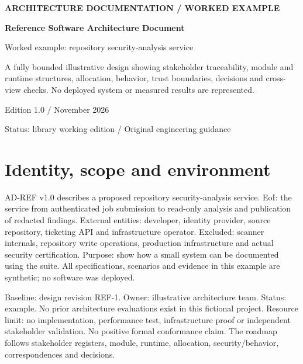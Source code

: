 \documentclass[11pt,letterpaper]{article}
\newcommand{\docsection}[1]{\Needspace{5\baselineskip}\section{#1}}
\begin{document}
\begin{titlepage}\thispagestyle{empty}\raggedright
\vspace*{0.65in}
{\sffamily\bfseries\color{teal} ARCHITECTURE DOCUMENTATION / WORKED EXAMPLE\par}
\vspace{0.35in}
{\sffamily\bfseries\color{navy}\Huge Reference Software Architecture Document\par}
\vspace{0.2in}
{\sffamily\Large\color{muted} Worked example: repository security-analysis service\par}
\vspace{0.35in}\noindent{\color{teal}\rule{\linewidth}{1.5pt}}\par
\vspace{0.3in}
A fully bounded illustrative design showing stakeholder traceability, module and runtime structures, allocation, behavior, trust boundaries, decisions and cross-view checks. No deployed system or measured results are represented.

\vfill
{\sffamily\small Edition 1.0 \quad /  November 2026\par
Status: library working edition \quad / \quad Original engineering guidance\par}
\end{titlepage}
\tableofcontents\clearpage
\docsection{Identity, scope and environment}
AD-REF v1.0 describes a proposed repository security-analysis service. EoI: the service from authenticated job submission to read-only analysis and publication of redacted findings. External entities: developer, identity provider, source repository, ticketing API and infrastructure operator. Excluded: scanner internals, repository write operations, production infrastructure and actual security certification. Purpose: show how a small system can be documented using the suite. All specifications, scenarios and evidence in this example are synthetic; no software was deployed.

Baseline: design revision REF-1. Owner: illustrative architecture team. Status: example. No prior architecture evaluations exist in this fictional project. Resource limit: no implementation, performance test, infrastructure proof or independent stakeholder validation. No positive formal conformance claim. The roadmap follows stakeholder registers, module, runtime, allocation, security/behavior, correspondences and decisions.
\end{document}
